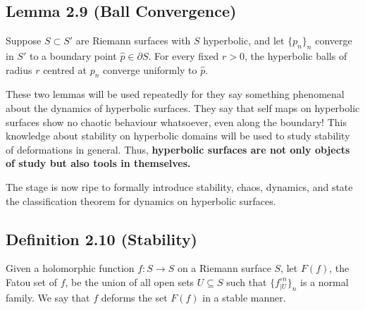 \documentclass[11pt,a4paper]{article}
\begin{document}

        \subsection*{Lemma 2.9 (Ball Convergence)} Suppose $S\subset S'$ are Riemann surfaces with $S$ hyperbolic, and let $\{p_n\}_n$ converge in $S'$ to a boundary point $\hat p\in\partial S$. For every fixed $r>0$, the hyperbolic balls of radius $r$ centred at $p_n$ converge uniformly to $\hat p$.


        \begin{figure}[ht!]
        \end{figure}


        These two lemmas will be used repeatedly for they say something phenomenal about the dynamics of hyperbolic surfaces. They say that self maps on hyperbolic surfaces show no chaotic behaviour whatsoever, even along the boundary! This knowledge about stability on hyperbolic domains will be used to study stability of deformations in general. Thus, \textbf{hyperbolic surfaces are not only objects of study but also tools in themselves.}

        The stage is now ripe to formally introduce stability, chaos, dynamics, and state the classification theorem for dynamics on hyperbolic surfaces.

        \subsection*{Definition 2.10 (Stability)} Given a holomorphic function $f: S\rightarrow S$ on a Riemann surface $S$, let $F(f)$, the Fatou set of $f$, be the union of all open sets $U \subseteq S$ such that $\{f_{\big|U}^{\circ n}\}_n$ is a normal family. We say that $f$ deforms the set $F(f)$ in a stable manner.
\end{document}
